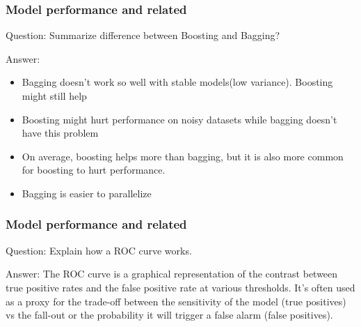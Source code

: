 \documentclass[11pt]{beamer}
\begin{document}
\begin{frame}
\frametitle{Model performance and related}
\begin{block}{Question:}
	Summarize difference between Boosting and Bagging?
\end{block}
\begin{block}{Answer:}
	\begin{itemize}
		\item Bagging doesn’t work so well with stable models(low variance). Boosting might still
		help
		\item Boosting might hurt performance on noisy datasets while bagging doesn't have this problem
		\item On average, boosting helps more than bagging, but it is also more
		common for boosting to hurt performance.
		\item Bagging is easier to parallelize
	\end{itemize}
\end{block}
\end{frame}

\begin{frame}
\frametitle{Model performance and related}
\begin{block}{Question:}
	Explain how a ROC curve works.
\end{block}
\begin{block}{Answer:}
	The ROC curve is a graphical representation of the contrast between true positive rates and the false positive rate at various thresholds. It’s often used as a proxy for the trade-off between the sensitivity of the model (true positives) vs the fall-out or the probability it will trigger a false alarm (false positives).
\end{block}
\end{frame}
\end{document}
